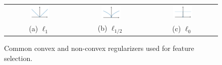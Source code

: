 


 \begin{figure}[H]
    \centering
    \begin{tabular}{ccc}
        \includegraphics[width=0.3\textwidth]{figures/l1_regularizer.pdf}
&
           \includegraphics[width=0.3\textwidth]{figures/lh_regularizer.pdf}
    &
    \includegraphics[width=0.3\textwidth]{figures/l0_regularizer.pdf}\\
              (a) $\ell_1$  & (b) $\ell_{1/2}$ & (c) $\ell_0$
    \end{tabular}
    \caption{Common convex and non-convex regularizers used for feature selection.}
    \label{fig:regularizers}
\end{figure}


